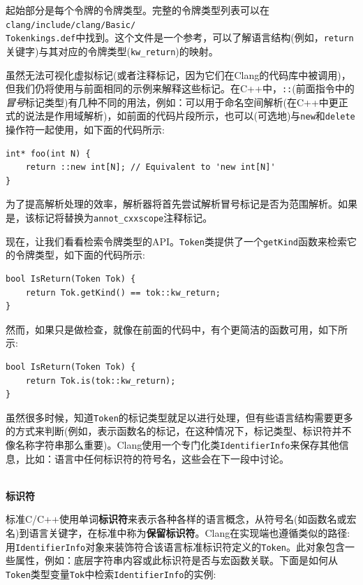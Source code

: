 起始部分是每个令牌的令牌类型。完整的令牌类型列表可以在\texttt{clang/include/clang/Basic/\\Tokenkings.def}中找到。这个文件是一个参考，可以了解语言结构(例如，\texttt{return}关键字)与其对应的令牌类型(\texttt{kw\_return})的映射。

虽然无法可视化虚拟标记(或者注释标记，因为它们在Clang的代码库中被调用)，但我们仍将使用与前面相同的示例来解释这些标记。在C++中，\texttt{::}(前面指令中的\textit{冒号}标记类型)有几种不同的用法，例如：可以用于命名空间解析(在C++中更正式的说法是作用域解析)，如前面的代码片段所示，也可以(可选地)与\texttt{new}和\texttt{delete}操作符一起使用，如下面的代码所示:

\begin{lstlisting}[style=styleCXX]
int* foo(int N) {
	return ::new int[N]; // Equivalent to 'new int[N]'
}
\end{lstlisting}

为了提高解析处理的效率，解析器将首先尝试解析冒号标记是否为范围解析。如果是，该标记将替换为\texttt{annot\_cxxscope}注释标记。
 
现在，让我们看看检索令牌类型的API。\texttt{Token}类提供了一个\texttt{getKind}函数来检索它的令牌类型，如下面的代码所示:

\begin{lstlisting}[style=styleCXX]
bool IsReturn(Token Tok) {
	return Tok.getKind() == tok::kw_return;
}
\end{lstlisting}

然而，如果只是做检查，就像在前面的代码中，有个更简洁的函数可用，如下所示:

\begin{lstlisting}[style=styleCXX]
bool IsReturn(Token Tok) {
	return Tok.is(tok::kw_return);
}
\end{lstlisting}

虽然很多时候，知道\texttt{Token}的标记类型就足以进行处理，但有些语言结构需要更多的方式来判断(例如，表示函数名的标记，在这种情况下，标记类型、标识符并不像名称字符串那么重要)。Clang使用一个专门化类\texttt{IdentifierInfo}来保存其他信息，比如：语言中任何标识符的符号名，这些会在下一段中讨论。

\hspace*{\fill} \\ %
\noindent
\textbf{标识符}

标准C/C++使用单词\textbf{标识符}来表示各种各样的语言概念，从符号名(如函数名或宏名)到语言关键字，在标准中称为\textbf{保留标识符}。Clang在实现端也遵循类似的路径:用\texttt{IdentifierInfo}对象来装饰符合该语言标准标识符定义的\texttt{Token}。此对象包含一些属性，例如：底层字符串内容或此标识符是否与宏函数关联。下面是如何从\texttt{Token}类型变量\texttt{Tok}中检索\texttt{IdentifierInfo}的实例:

